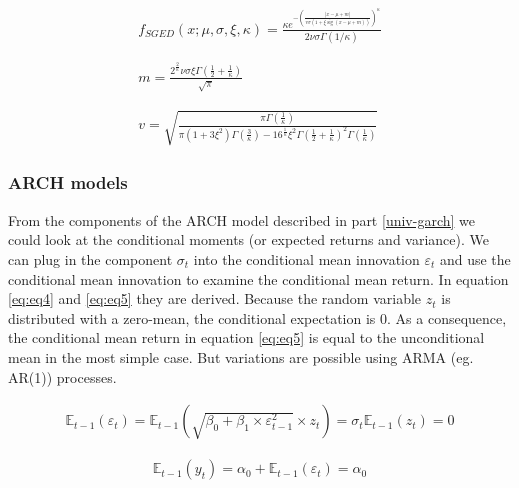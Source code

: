 \documentclass[a4paper, twoside]{templates/ociamthesis}
\begin{document}
\begin{equation}
\begin{array}{c}f_{S G E D}(x ; \mu, \sigma, \xi, \kappa)=\frac{\kappa e^{-\left(\frac{|x-\mu+m|}{v \sigma(1+\xi \operatorname{sig}(x-\mu+m))}\right)^{\kappa}}}{2 \nu \sigma \Gamma(1 / \kappa)} \\ \\ \\ m=\frac{2^{\frac{2}{\kappa}} \nu \sigma \xi \Gamma\left(\frac{1}{2}+\frac{1}{\kappa}\right)}{\sqrt{\pi}} \\ \\ \\ v=\sqrt{\frac{\pi \Gamma\left(\frac{1}{\kappa}\right)}{\pi\left(1+3 \xi^{2}\right) \Gamma\left(\frac{3}{\kappa}\right)-16^{\frac{1}{\kappa}} \xi^{2} \Gamma\left(\frac{1}{2}+\frac{1}{\kappa}\right)^{2} \Gamma\left(\frac{1}{\kappa}\right)}}\end{array}\label{eq:sged}
\end{equation}

\hypertarget{ARCH}{%
\subsubsection{ARCH models}\label{ARCH}}

\noindent From the components of the ARCH model described in part \ref{univ-garch} we could look at the conditional moments (or expected returns and variance). We can plug in the component \(\sigma_t\) into the conditional mean innovation \(\varepsilon_{t}\) and use the conditional mean innovation to examine the conditional mean return. In equation \eqref{eq:eq4} and \eqref{eq:eq5} they are derived. Because the random variable \(z_t\) is distributed with a zero-mean, the conditional expectation is 0. As a consequence, the conditional mean return in equation \eqref{eq:eq5} is equal to the unconditional mean in the most simple case. But variations are possible using ARMA (eg. AR(1)) processes.

\begin{align} 
\mathbb{E}_{t-1}(\varepsilon_{t}) = \mathbb{E}_{t-1}(\sqrt{\beta_0 + \beta_1 \times  \varepsilon_{t-1}^2} \times z_t) = \sigma_t\mathbb{E}_{t-1}(z_t) = 0
 \label{eq:eq4}
\end{align} 

\begin{align} 
\mathbb{E}_{t-1}(y_{t}) = \alpha_0 + \mathbb{E}_{t-1}(\varepsilon_{t}) = \alpha_0
 \label{eq:eq5}
\end{align}
\end{document}
